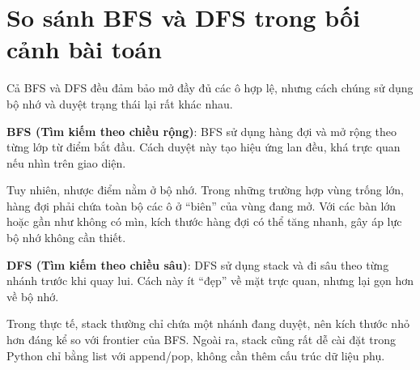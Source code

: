 \section{So sánh BFS và DFS trong bối cảnh bài toán}

Cả BFS và DFS đều đảm bảo mở đầy đủ các ô hợp lệ, nhưng cách chúng sử dụng bộ nhớ và duyệt trạng thái lại rất khác nhau.

\textbf{BFS (Tìm kiếm theo chiều rộng)}:
BFS sử dụng hàng đợi và mở rộng theo từng lớp từ điểm bắt đầu. Cách duyệt này tạo hiệu ứng lan đều, khá trực quan nếu nhìn trên giao diện.

Tuy nhiên, nhược điểm nằm ở bộ nhớ. Trong những trường hợp vùng trống lớn, hàng đợi phải chứa toàn bộ các ô ở “biên” của vùng đang mở. Với các bàn lớn hoặc gần như không có mìn, kích thước hàng đợi có thể tăng nhanh, gây áp lực bộ nhớ không cần thiết.

\textbf{DFS (Tìm kiếm theo chiều sâu)}:
DFS sử dụng stack và đi sâu theo từng nhánh trước khi quay lui. Cách này ít “đẹp” về mặt trực quan, nhưng lại gọn hơn về bộ nhớ.

Trong thực tế, stack thường chỉ chứa một nhánh đang duyệt, nên kích thước nhỏ hơn đáng kể so với frontier của BFS. Ngoài ra, stack cũng rất dễ cài đặt trong Python chỉ bằng list với append/pop, không cần thêm cấu trúc dữ liệu phụ.
